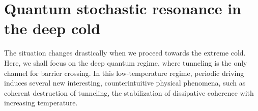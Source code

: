 \documentclass[30pt,twocolumn,letterpaper]{article}
\begin{document}
\section{Quantum stochastic resonance in the deep cold}
The situation changes drastically when we proceed towards the extreme cold. Here, we shall focus on the deep quantum regime, where tunneling is the only channel for barrier crossing. In this low-temperature regime, periodic driving induces several new interesting, counterintuitive physical phenomena, such as coherent destruction of tunneling, the stabilization of dissipative coherence with increasing temperature\cite{Wellens2004Stochastic}.
{\small


}
\end{document}
